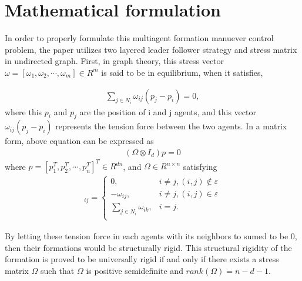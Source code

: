 \section{Mathematical formulation} \label{Mathematical_formulation}


 In order to properly formulate this multiagent formation manuever control problem, the paper utilizes two layered leader follower strategy and stress matrix in undirected graph. 
 First, in graph theory, this stress vector $\omega = [\omega_1, \omega_2, \cdots, \omega_m] \in R^m$ is said to be in equilibrium, when it satisfies,

\begin{align*}
    \sum_{j \in N_i} \omega_{ij} (p_j - p_i) = 0, 
\end{align*} 
where this $p_i$ and $p_j$ are the position of i and j agents, and this vector $\omega_{ij} (p_j - p_i)$ represents the tension force between the two agents. In a matrix form, above equation can be expressed as 
\begin{align*}
    (\Omega \otimes  I_d)p = 0
\end{align*} 
where $p = [p_1^T, p_2^T, \cdots, p_n^T]^T \in R^{d n}$, and $\Omega \in R^{n \times n}$ satisfying
\begin{align*}
    [\Omega]_{ij} =  
    \begin{cases}
        0, &i \neq j, (i, j)\notin \varepsilon  \\
        -\omega_{ij}, &i \neq j, (i, j)\in \varepsilon \\
        \sum_{j \in N_i} \omega_{ik}, &i = j. \\    
    \end{cases}
\end{align*} 

By letting these tension force in each agents with its neighbors to sumed to be 0, then their formations would be structurally rigid. This structural rigidity of the formation is proved to be universally rigid if and only if there exists a stress matrix $\Omega$ such that $\Omega$ is positive semidefinite and $rank(\Omega) = n - d - 1$. %


